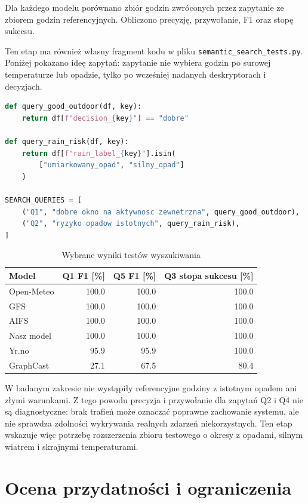 \documentclass[a4paper,12pt]{article}
\begin{document}
\noindent
Dla każdego modelu porównano zbiór godzin zwróconych przez zapytanie ze zbiorem
godzin referencyjnych. Obliczono precyzję, przywołanie, F1 oraz stopę sukcesu.

\noindent
Ten etap ma również własny fragment kodu w pliku
\texttt{semantic\_search\_tests.py}. Poniżej pokazano ideę zapytań: zapytanie
nie wybiera godzin po surowej temperaturze lub opadzie, tylko po wcześniej
nadanych deskryptorach i decyzjach.

\begin{lstlisting}[language=Python]
def query_good_outdoor(df, key):
    return df[f"decision_{key}"] == "dobre"

def query_rain_risk(df, key):
    return df[f"rain_label_{key}"].isin(
        ["umiarkowany_opad", "silny_opad"]
    )

SEARCH_QUERIES = [
    ("Q1", "dobre okno na aktywnosc zewnetrzna", query_good_outdoor),
    ("Q2", "ryzyko opadow istotnych", query_rain_risk),
]
\end{lstlisting}

\begin{table}[h]
\centering
\caption{Wybrane wyniki testów wyszukiwania}
\begin{tabular}{lrrr}
\toprule
Model & Q1 F1 [\%] & Q5 F1 [\%] & Q3 stopa sukcesu [\%] \\
\midrule
Open-Meteo & 100.0 & 100.0 & 100.0 \\
GFS & 100.0 & 100.0 & 100.0 \\
AIFS & 100.0 & 100.0 & 100.0 \\
Nasz model & 100.0 & 100.0 & 100.0 \\
Yr.no & 95.9 & 95.9 & 100.0 \\
GraphCast & 27.1 & 67.5 & 80.4 \\
\bottomrule
\end{tabular}
\end{table}

\noindent
W badanym zakresie nie wystąpiły referencyjne godziny z istotnym opadem ani
złymi warunkami. Z tego powodu precyzja i przywołanie dla zapytań Q2 i Q4 nie
są diagnostyczne: brak trafień może oznaczać poprawne zachowanie systemu, ale
nie sprawdza zdolności wykrywania realnych zdarzeń niekorzystnych. Ten etap
wskazuje więc potrzebę rozszerzenia zbioru testowego o okresy z opadami,
silnym wiatrem i skrajnymi temperaturami.

\section{Ocena przydatności i ograniczenia}
\end{document}
